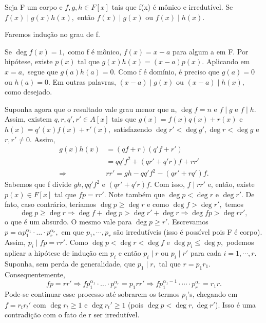 \documentclass[AlgebraII/algebraII_notes.tex]{subfiles}
\begin{document}
\begin{crl*}
	Seja F um corpo e \(f, g, h\in F[x]\) tais que f(x) é mônico e irredutível.
	Se \(f(x)\mid g(x)h(x),\) então \(f(x)\mid g(x)\) ou \(f(x)\mid h(x).\)
\end{crl*}
\begin{proof*}
	Faremos indução no grau de f.

	Se \(\deg{f(x)} = 1,\) como f é mônico, \(f(x) = x-a\) para algum a em F. Por hipótese, existe \(p(x)\) tal que
	\(g(x)h(x) = (x-a)p(x).\) Aplicando em \(x=a,\) segue que \(g(a)h(a) = 0.\) Como f é domínio, é preciso que
	\(g(a) = 0\) ou \(h(a) = 0\). Em outras palavras, \((x-a)\mid g(x)\) ou \((x-a)\mid h(x),\) como desejado.

	Suponha agora que o resultado vale grau menor que n, \(\deg{f} = n\) e \(f\mid g\) e \(f\mid h.\) Assim, existem
	\(q, r, q', r'\in A[x]\) tais que \(g(x) = f(x)q(x) + r(x)\) e \(h(x) = q'(x)f(x) + r'(x),\) satisfazendo
	\(\deg{r'} < \deg{g'}, \deg{r} < \deg{g}\) e \(r, r'\neq 0.\) Assim,
	\begin{align*}
		g(x)h(x)    & = (qf + r)(q'f + r')                \\
		            & = qq'f^{2} + (qr' + q'r)f + rr'     \\
		\Rightarrow & rr' = gh - qq'f^{2} - (qr' + rq')f.
	\end{align*}
	Sabemos que f divide \(gh, qq'f^{2}\) e \((qr' + q'r)f.\) Com isso, \(f\mid rr'\) e, então,
	existe \(p(x)\in F[x]\) tal que \(fp = rr'.\) Note também que \(\deg{p} < \deg{r} \) e \(\deg{r'}.\) De fato,
	caso contrário, teríamos \(\deg{p}\geq \deg{r}\) e como \(\deg{f} > \deg{r'},\) temos
	\[
		\deg{p}\geq \deg{r} \Rightarrow \deg{f} + \deg{p} > \deg{r'} + \deg{r} \Rightarrow \deg{fp} > \deg{rr'},
	\]
	o que é um absurdo. O mesmo vale para \(\deg{p}\geq r'.\) Escrevamos \(p = \alpha p_{1}^{\alpha_{1}}\cdot \dotsc \cdot p_{r}^{\alpha_{r}},\)
	em que \(p_{1}, \cdots, p_{r}\) são irredutíveis (isso é possível pois F é corpo). Assim, \(p_{i}\mid fp = rr'.\)
	Como \(\deg{p} < \deg{r} < \deg{f}\) e \(\deg{p_{i}}\leq \deg{p},\) podemos aplicar a hipótese de indução em \(p_{i}\) e então
	\(p_{i}\mid r\) ou \(p_{i}\mid r'\) para cada \(i=1, \cdots, r\). Suponha, sem perda de generalidade, que \(p_{1}\mid r,\) tal que
	\(r=p_{1}r_{1}\). Consequentemente,
	\[
		fp = rr' \Rightarrow fp_{1}^{\alpha_{1}}\cdot \dotsc \cdot p_{r}^{\alpha_{r}} = p_{1}rr' \Rightarrow fp_{1}^{\alpha_{1} -1}\cdot \cdots \cdot p_{r}^{\alpha_{r}} = r_{1}r.
	\]
	Pode-se continuar esse processo até sobrarem os termos \(p_{i}\)'s, chegando em
	\(f = r_{t}r_{t}'\) com \(\deg{r_{t}}\geq 1\) e \(\deg{r_{t}'}\geq 1\) (pois \(\deg{p} < \deg{r}, \deg{r'}\)). Isso é uma contradição
	com o fato de r ser irredutível.
\end{proof*}
\end{document}
